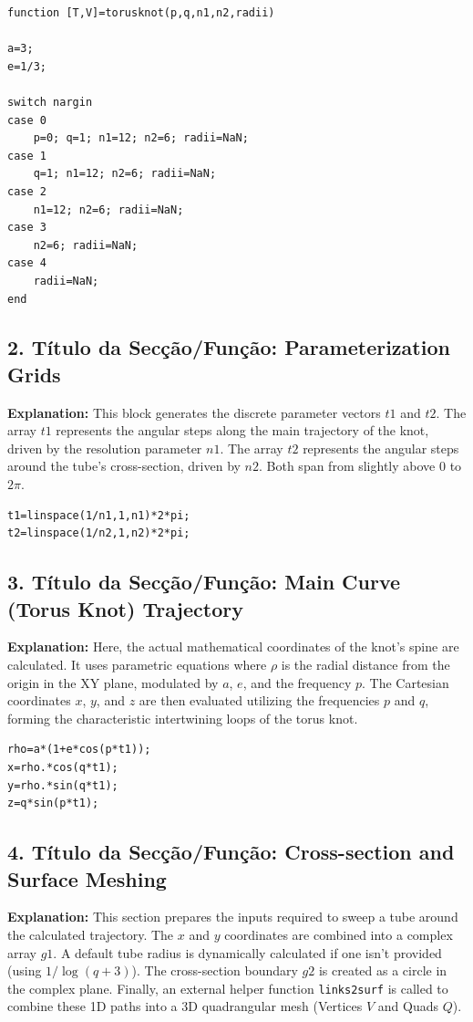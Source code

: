 \begin{lstlisting}
function [T,V]=torusknot(p,q,n1,n2,radii)

a=3;
e=1/3; 

switch nargin
case 0
    p=0; q=1; n1=12; n2=6; radii=NaN;
case 1
    q=1; n1=12; n2=6; radii=NaN;
case 2
    n1=12; n2=6; radii=NaN;
case 3
    n2=6; radii=NaN;
case 4
    radii=NaN;
end
\end{lstlisting}

\subsection*{2. Título da Secção/Função: Parameterization Grids}
\textbf{Explanation:} This block generates the discrete parameter vectors $t1$ and $t2$. The array $t1$ represents the angular steps along the main trajectory of the knot, driven by the resolution parameter $n1$. The array $t2$ represents the angular steps around the tube's cross-section, driven by $n2$. Both span from slightly above $0$ to $2\pi$.

\begin{lstlisting}
t1=linspace(1/n1,1,n1)*2*pi;
t2=linspace(1/n2,1,n2)*2*pi;
\end{lstlisting}

\subsection*{3. Título da Secção/Função: Main Curve (Torus Knot) Trajectory}
\textbf{Explanation:} Here, the actual mathematical coordinates of the knot's spine are calculated. It uses parametric equations where $\rho$ is the radial distance from the origin in the XY plane, modulated by $a$, $e$, and the frequency $p$. The Cartesian coordinates $x$, $y$, and $z$ are then evaluated utilizing the frequencies $p$ and $q$, forming the characteristic intertwining loops of the torus knot.

\begin{lstlisting}
rho=a*(1+e*cos(p*t1));
x=rho.*cos(q*t1);
y=rho.*sin(q*t1); 
z=q*sin(p*t1);
\end{lstlisting}

\subsection*{4. Título da Secção/Função: Cross-section and Surface Meshing}
\textbf{Explanation:} This section prepares the inputs required to sweep a tube around the calculated trajectory. The $x$ and $y$ coordinates are combined into a complex array $g1$. A default tube radius is dynamically calculated if one isn't provided (using $1/\log(q+3)$). The cross-section boundary $g2$ is created as a circle in the complex plane. Finally, an external helper function \texttt{links2surf} is called to combine these 1D paths into a 3D quadrangular mesh (Vertices $V$ and Quads $Q$).


